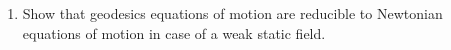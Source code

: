 \documentclass[../main-sheet.tex]{subfiles}
\begin{document}
\begin{enumerate}
\begin{enumerate}
        \item Show that geodesics equations of motion are reducible to Newtonian equations of motion in case of a weak static field.

\end{enumerate}
\end{enumerate}
\end{document}
